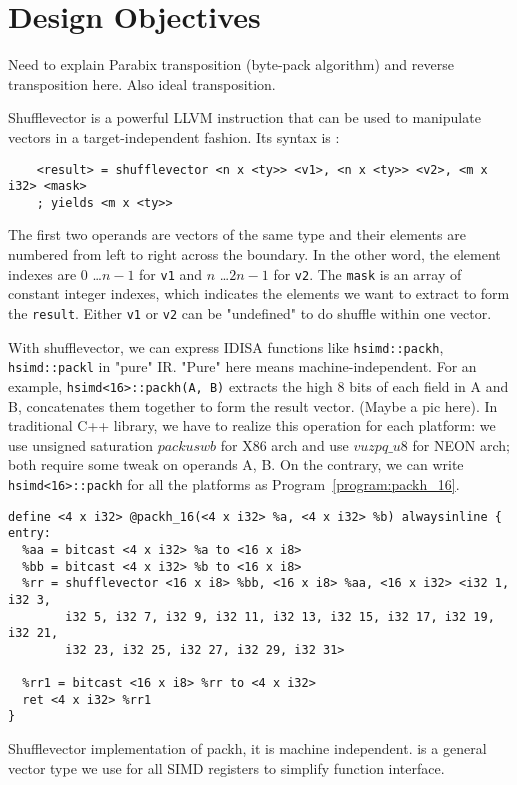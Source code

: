 %
%

\chapter{Design Objectives}
\label{three}

Need to explain Parabix transposition (byte-pack algorithm) and reverse transposition here. Also ideal transposition.

Shufflevector is a powerful LLVM instruction that can be used to manipulate vectors in a target-independent fashion. Its syntax is \cite{llvm_lang_ref}:

\begin{verbatim}
    <result> = shufflevector <n x <ty>> <v1>, <n x <ty>> <v2>, <m x i32> <mask>
    ; yields <m x <ty>>
\end{verbatim}

The first two operands are vectors of the same type and their elements are numbered from left to right across the boundary. In the other word, the element indexes are $0$ \ldots $n-1$ for {\tt v1} and $n$ \ldots $2n-1$ for {\tt v2}. The {\tt mask} is an array of constant integer indexes, which indicates the elements we want to extract to form the {\tt result}. Either {\tt v1} or {\tt v2} can be "undefined" to do shuffle within one vector.

With shufflevector, we can express IDISA functions like \verb|hsimd::packh|, \verb|hsimd::packl| in "pure" IR. "Pure" here means machine-independent. For an example, \verb|hsimd<16>::packh(A, B)| extracts the high 8 bits of each field in A and B, concatenates them together to form the result vector. (Maybe a pic here). In traditional C++ library, we have to realize this operation for each platform: we use unsigned saturation $packuswb$ for X86 arch and use $vuzpq\_u8$ for NEON arch; both require some tweak on operands A, B. On the contrary, we can write \verb|hsimd<16>::packh| for all the platforms as Program~\ref{program:packh_16}.

\begin{program}
\begin{verbatim}
define <4 x i32> @packh_16(<4 x i32> %a, <4 x i32> %b) alwaysinline {
entry:
  %aa = bitcast <4 x i32> %a to <16 x i8>
  %bb = bitcast <4 x i32> %b to <16 x i8>
  %rr = shufflevector <16 x i8> %bb, <16 x i8> %aa, <16 x i32> <i32 1, i32 3,
        i32 5, i32 7, i32 9, i32 11, i32 13, i32 15, i32 17, i32 19, i32 21,
        i32 23, i32 25, i32 27, i32 29, i32 31>

  %rr1 = bitcast <16 x i8> %rr to <4 x i32>
  ret <4 x i32> %rr1
}
\end{verbatim}
\caption[Shufflevector implementation of packh.]{Shufflevector implementation of packh, it is machine independent. {\tt <4 x i32>} is a general vector type we use for all SIMD registers to simplify function interface.}
\label{program:packh_16}
\end{program}

